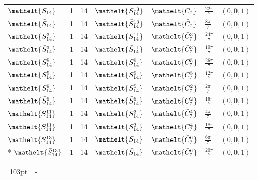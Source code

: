 \documentclass[10pt,a4paper]{article}
\newcommand{\needspace}[1]{\par\penalty-100\begingroup\dimen0=#1\relax\dimen2=\pagegoal
  \advance\dimen2-\pagetotal\ifdim\dimen0>\dimen2\relax\ifdim\dimen2>0pt\vfil\break\fi\fi
  \endgroup}
\numberwithin{equation}{section}
\newcommand{\eltfont}[1]{{\let\sigma\eltsigma\mathelt{#1}}}
\newcommand{\cls}[1]{\eltfont{#1}}
\newcommand{\dirvec}[3]{(#1, #2, #3)}
\newcommand{\barred}[1]{\bar{#1}}
\begin{document}
{\begin{longtable}{@{}lrrllll@{}}
$\cls{S_{14}}$ & 1 & 14 & $\cls{S_{14}^{13}}$ & $\cls{\barred{C}_{7}}$ & $\tfrac{22\pi}{7}$ & $\dirvec{0}{0}{1}$\\
$\cls{\barred{S}_{14}}$ & 1 & 14 & $\cls{\barred{S}_{14}^{13}}$ & $\cls{\barred{C}_{7}}$ & $\tfrac{8\pi}{7}$ & $\dirvec{0}{0}{1}$\\
$\cls{S_{14}^{3}}$ & 1 & 14 & $\cls{S_{14}^{11}}$ & $\cls{\barred{C}_{7}^{3}}$ & $\tfrac{24\pi}{7}$ & $\dirvec{0}{0}{1}$\\
$\cls{\barred{S}_{14}^{3}}$ & 1 & 14 & $\cls{\barred{S}_{14}^{11}}$ & $\cls{\barred{C}_{7}^{3}}$ & $\tfrac{10\pi}{7}$ & $\dirvec{0}{0}{1}$\\
$\cls{S_{14}^{5}}$ & 1 & 14 & $\cls{S_{14}^{9}}$ & $\cls{C_{7}^{5}}$ & $\tfrac{26\pi}{7}$ & $\dirvec{0}{0}{1}$\\
$\cls{\barred{S}_{14}^{5}}$ & 1 & 14 & $\cls{\barred{S}_{14}^{9}}$ & $\cls{C_{7}^{5}}$ & $\tfrac{12\pi}{7}$ & $\dirvec{0}{0}{1}$\\
$\cls{S_{14}^{9}}$ & 1 & 14 & $\cls{S_{14}^{5}}$ & $\cls{C_{7}^{2}}$ & $\tfrac{2\pi}{7}$ & $\dirvec{0}{0}{1}$\\
$\cls{\barred{S}_{14}^{9}}$ & 1 & 14 & $\cls{\barred{S}_{14}^{5}}$ & $\cls{C_{7}^{2}}$ & $\tfrac{16\pi}{7}$ & $\dirvec{0}{0}{1}$\\
$\cls{S_{14}^{11}}$ & 1 & 14 & $\cls{S_{14}^{3}}$ & $\cls{\barred{C}_{7}^{4}}$ & $\tfrac{4\pi}{7}$ & $\dirvec{0}{0}{1}$\\
$\cls{\barred{S}_{14}^{11}}$ & 1 & 14 & $\cls{\barred{S}_{14}^{3}}$ & $\cls{\barred{C}_{7}^{4}}$ & $\tfrac{18\pi}{7}$ & $\dirvec{0}{0}{1}$\\
$\cls{S_{14}^{13}}$ & 1 & 14 & $\cls{S_{14}}$ & $\cls{\barred{C}_{7}^{6}}$ & $\tfrac{6\pi}{7}$ & $\dirvec{0}{0}{1}$\\*
$\cls{\barred{S}_{14}^{13}}$ & 1 & 14 & $\cls{\barred{S}_{14}}$ & $\cls{\barred{C}_{7}^{6}}$ & $\tfrac{20\pi}{7}$ & $\dirvec{0}{0}{1}$\\
\bottomrule\end{longtable}}
\needspace{103pt}
\end{document}
